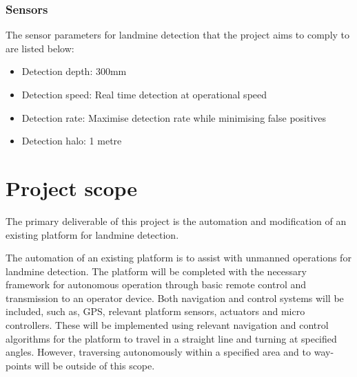 \documentclass[main.tex]{subfiles}
\begin{document}
\subsubsection{Sensors}
The sensor parameters for landmine detection that the project aims to comply to are listed below:
\begin{itemize}
\item Detection depth: 300mm 
\item Detection speed: Real time detection at operational speed
\item Detection rate: Maximise detection rate while minimising false positives
\item Detection halo: 1 metre
\end{itemize}



\section{Project scope}

The primary deliverable of this project is the automation and modification of an existing platform for landmine detection. %

The automation of an existing platform is to assist with unmanned operations for landmine detection. The platform will be completed with the necessary framework for autonomous operation through basic remote control and transmission to an operator device. Both navigation and control systems will be included, such as, GPS, relevant platform sensors, actuators and micro controllers. These will be implemented using relevant navigation and control algorithms for the platform to travel in a straight line and turning at specified angles. However, traversing autonomously within a specified area and to way-points will be outside of this scope. 
\end{document}
